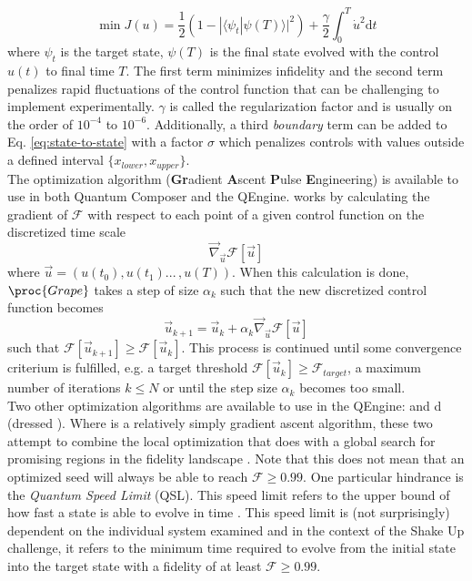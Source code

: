 \documentclass[a4paper, twocolumn]{revtex4-1}
\begin{document}
\begin{equation}
	\min J(u) = \frac{1}{2}(1-| \langle \psi_{t} | \psi(T) \rangle|^2) + \frac{\gamma}{2} \int_{0}^{T} \dot{u}^2 \text{d}t
	\label{eq:state-to-state}
\end{equation}
where $\psi_{t}$ is the target state, $\psi(T)$ is the final state evolved with the control $u(t)$ to final time $T$. The first term minimizes infidelity and the second term penalizes rapid fluctuations of the control function that can be challenging to implement experimentally. $\gamma$ is called the regularization factor and is usually on the order of $10^{-4}$ to $10^{-6}$. Additionally, a third \textit{boundary} term can be added to Eq. \eqref{eq:state-to-state} with a factor $\sigma$ which penalizes controls with values outside a defined interval $\{x_{lower}, x_{upper}\}$.\\

The optimization algorithm  (\textbf{Gr}adient \textbf Ascent \textbf Pulse \textbf Engineering) \cite{KHANEJA2005296} is available to use in both Quantum Composer and the QEngine.  works by calculating the gradient of $\mathcal{F}$ with respect to each point of a given control function on the discretized time scale 
\begin{equation}
	\vec{\nabla}_{\vec{u}} \mathcal{F}[\vec{u}]
\end{equation}
where $\vec{u} = (u(t_0), u(t_1) ... \,, u(T))$. When this calculation is done, $\proc{Grape}$ takes a step of size $\alpha_k$ such that the new discretized control function becomes
\begin{equation}
	\vec{u}_{k+1} = \vec{u}_{k} + \alpha_k \vec{\nabla}_{\vec{u}} \mathcal{F}[\vec{u}]
\end{equation}
such that $\mathcal{F}[\vec{u}_{k+1}] \geq \mathcal{F}[\vec{u}_{k}]$. This process is continued until some convergence criterium is fulfilled, e.g. a target threshold $\mathcal{F}[\vec{u}_{k}] \geq \mathcal{F}_{target}$, a maximum number of iterations $k \leq N$ or until the step size $\alpha_k$ becomes too small. \\

Two other optimization algorithms are available to use in the QEngine:  and d (dressed ). Where  is a relatively simply gradient ascent algorithm, these two attempt to combine the local optimization that  does with a global search for promising regions in the fidelity landscape \cite{GroupPaper, QEngine}. 
Note that this does not mean that an optimized seed will always be able to reach $\mathcal{F} \geq 0.99$. One particular hindrance is the \textit{Quantum Speed Limit} (QSL). This speed limit refers to the upper bound of how fast a state is able to evolve in time \cite{Deffner_2017}. This speed limit is (not surprisingly) dependent on the individual system examined and in the context of the Shake Up challenge, it refers to the minimum time required to evolve from the initial state into the target state with a fidelity of at least $\mathcal{F} \geq 0.99$. \\
\end{document}
